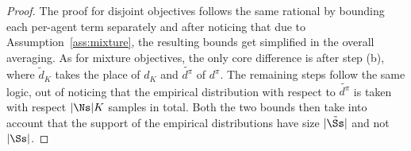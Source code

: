 \begin{proof}
    The proof for disjoint objectives follows the same rational by bounding each per-agent term separately and after noticing that due to Assumption~\ref{ass:mixture}, the resulting bounds get simplified in the overall averaging. As for mixture objectives, the only core difference is after step (b), where $\tilde{d}_K$ takes the place of $d_K$ and $\tilde{d^\pi}$ of $d^\pi$. The remaining steps follow the same logic, out of noticing that the empirical distribution with respect to $\tilde{d^\pi}$ is taken with respect $|\Ns|K$ samples in total. Both the two bounds then take into account that the support of the empirical distributions have size $|\tilde \Ss|$ and not $|\Ss|$.
\end{proof}
